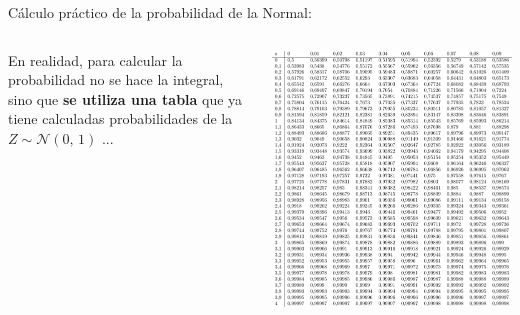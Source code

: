 \documentclass[11pt,handout]{beamer}
\begin{document}
\begin{frame}{Cálculo práctico de la probabilidad de la Normal:}
\begin{columns}
\begin{column}{0.4\textwidth}
\begin{block}{}
En realidad, para calcular la probabilidad no se hace la integral, sino que \textbf{se utiliza una tabla} que ya tiene calculadas probabilidades de la  $Z \sim \mathcal{N}(0,\,1)
    $ ...
\end{block}
\end{column}
\begin{column}{0.6\textwidth}
\includegraphics[page=1,width=1\textwidth]{probabilidad/distribucion_normal}
\end{column}
\end{columns}


\end{frame}
\end{document}
